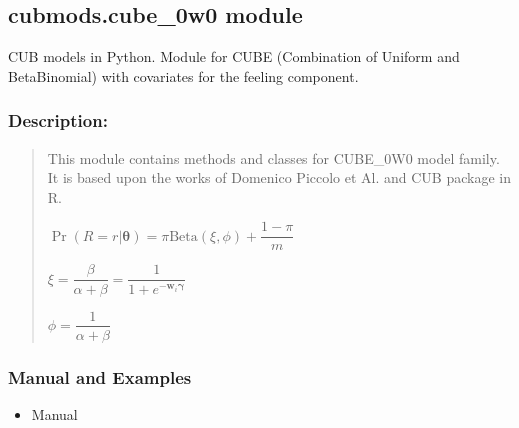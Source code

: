 \documentclass[letterpaper,10pt,english]{sphinxmanual}
\begin{document}
\subsection{cubmods.cube\_0w0 module}
\label{\detokenize{cubmods:module-cubmods.cube_0w0}}\label{\detokenize{cubmods:cubmods-cube-0w0-module}}
\sphinxAtStartPar
CUB models in Python.
Module for CUBE (Combination of Uniform
and Beta\sphinxhyphen{}Binomial) with covariates for the feeling component.


\subsubsection{Description:}
\label{\detokenize{cubmods:id95}}\begin{quote}

\sphinxAtStartPar
This module contains methods and classes
for CUBE\_0W0 model family.
It is based upon the works of Domenico
Piccolo et Al. and CUB package in R.

\sphinxAtStartPar
\(\Pr(R=r|\pmb{\theta}) = \pi \mathrm{Beta}(\xi,\phi)+\dfrac{1-\pi}{m}\)

\sphinxAtStartPar
\(\xi = \dfrac{\beta}{\alpha+\beta} = \dfrac{1}{1+e^{-\pmb w_i \pmb \gamma}}\)

\sphinxAtStartPar
\(\phi = \dfrac{1}{\alpha+\beta}\)
\end{quote}


\subsubsection{Manual and Examples}
\label{\detokenize{cubmods:id96}}\begin{itemize}
\item {} 
\sphinxAtStartPar
Manual 

\end{itemize}
\end{document}
